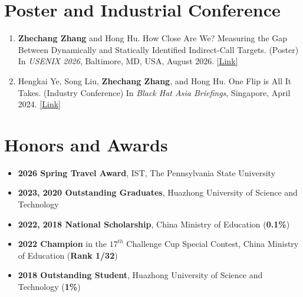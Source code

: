 \documentclass[letterpaper,10.8pt]{article}
\begin{document}
\section{Poster and Industrial Conference}
\begin{enumerate}[leftmargin=*]
\item[1] \textbf{Zhechang Zhang} and Hong Hu. How Close Are We? Measuring the Gap Between Dynamically and Statically Identified Indirect-Call Targets. (Poster) In \textit{USENIX 2026}, Baltimore, MD, USA, August 2026. \href{https://www.usenix.org/conference/usenixsecurity26/poster-session}{[\underline{Link}]}
\item[2] Hengkai Ye, Song Liu, \textbf{Zhechang Zhang}, and Hong Hu. One Flip is All It Takes. (Industry Conference) In \textit{Black Hat Asia Briefings}, Singapore, April 2024. \href{https://www.blackhat.com/asia-24/briefings/schedule/index.html#one-flip-is-all-it-takes-identifying-syscall-guard-variables-for-data-only-attacks-36285}{[\underline{Link}]}
\end{enumerate}


\vspace{-0.45cm}

\section{Honors and Awards}
\begin{itemize}[leftmargin=*]
\item {\textbf{2026 Spring Travel Award}, 
IST, The Pennsylvania State University
}

\item {\textbf{2023, 2020 Outstanding Graduates}, 
Huazhong University of Science and Technology
}

\item {\textbf{2022, 2018 National Scholarship}, 
China Ministry of Education
(\textbf{0.1\%})}

\item {\textbf{2022 Champion} in the $17^{th}$ Challenge Cup Special Contest, 
China Ministry of Education
(\textbf{Rank 1/32})}


\item {\textbf{2018 Outstanding Student}, 
Huazhong University of Science and Technology
(\textbf{1\%})}


\end{itemize}
\end{document}
